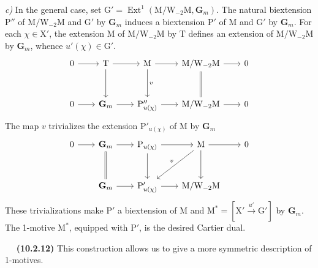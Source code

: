 \documentclass[11pt,leqno]{article}
\newcommand{\Page}[1]{\ifvmode\noindent\else\unskip\ \fi{\footnotesize\textcolor{gray}{[p.\,#1]}}\ \ignorespaces}
\begin{document}
\textit{c)} In the general case, set
\(\mathrm{G}'=\operatorname{Ext}^{1}
(\mathrm{M}/\mathrm{W}_{-2}\mathrm{M},\mathbf{G}_m)\).
The natural biextension \(\mathrm{P}''\) of
\(\mathrm{M}/\mathrm{W}_{-2}\mathrm{M}\) and \(\mathrm{G}'\)
by \(\mathbf{G}_m\) induces a biextension \(\mathrm{P}'\)
of \(\mathrm{M}\) and \(\mathrm{G}'\) by \(\mathbf{G}_m\).
For each \(\chi\in\mathrm{X}'\), the extension \(\mathrm{M}\)
of \(\mathrm{M}/\mathrm{W}_{-2}\mathrm{M}\) by \(\mathrm{T}\)
defines an extension of
\(\mathrm{M}/\mathrm{W}_{-2}\mathrm{M}\) by \(\mathbf{G}_m\),
whence \(u'(\chi)\in\mathrm{G}'\).
\[
\begin{tikzcd}[row sep=3em, column sep=2em]
0 \arrow[r] &
\mathrm{T} \arrow[r] \arrow[d] &
\mathrm{M} \arrow[r] \arrow[d, "v"] &
\mathrm{M}/\mathrm{W}_{-2}\mathrm{M}
  \arrow[r] \arrow[d, equal] &
0\\
0 \arrow[r] &
\mathbf{G}_m \arrow[r] &
\mathrm{P}''_{u(\chi)} \arrow[r] &
\mathrm{M}/\mathrm{W}_{-2}\mathrm{M} \arrow[r] &
0
\end{tikzcd}
\]
The map \(v\) trivializes the extension
\(\mathrm{P}'_{u(\chi)}\) of \(\mathrm{M}\) by \(\mathbf{G}_m\)
\[
\begin{tikzcd}[row sep=3em, column sep=2em]
0 \arrow[r] &
\mathbf{G}_m \arrow[r] \arrow[d, equal] &
\mathrm{P}_{u(\chi)} \arrow[r] \arrow[d] &
\mathrm{M} \arrow[r] \arrow[d] \arrow[dl, "v"'] &
0\\
& \mathbf{G}_m \arrow[r] &
\mathrm{P}'_{u(\chi)} \arrow[r] &
\mathrm{M}/\mathrm{W}_{-2}\mathrm{M} &
\end{tikzcd}
\]
These trivializations make \(\mathrm{P}'\) a biextension of
\(\mathrm{M}\) and
\(\mathrm{M}^{*}=[\mathrm{X}'\xrightarrow{u'}\mathrm{G}']\)
by \(\mathbf{G}_m\). The 1-motive \(\mathrm{M}^{*}\), equipped with
\(\mathrm{P}'\), is the desired Cartier dual.

\Page{68}
\textbf{(10.2.12)} This construction allows us to give a
more symmetric description of 1-motives.
\end{document}
